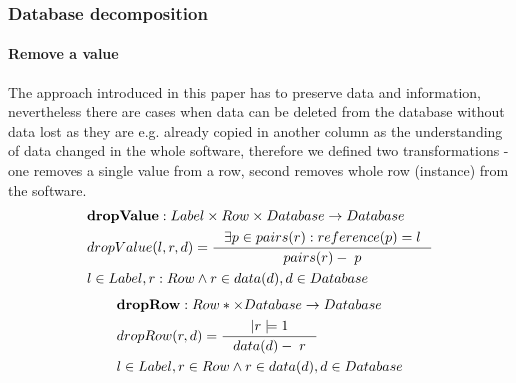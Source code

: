\documentclass[11pt]{article}
\begin{document}
\subsubsection{Database decomposition}
\paragraph{Remove a value}  The approach introduced in this paper has to  preserve data and information, nevertheless there are cases when data can be deleted from the database without data lost as they are e.g. already copied in another column as the understanding of data changed in the whole software, therefore we defined two transformations - one removes a single value from a row, second removes whole row (instance) from the software.
\begin{align*}
&	\mathbf{dropValue} : Label \times Row \times Database \rightarrow Database \\
&	dropValue(l, r, d) = \inference{\exists p \in pairs(r) : reference(p) = l}{pairs(r) - \; p}\\ 
& l \in Label, r : Row \wedge r \in data(d), d \in Database
\end{align*}
\begin{align*}
&	\mathbf{dropRow} :  Row*  \times Database \rightarrow Database\\
&	dropRow(r, d) = \inference{|r|=1}{data(d) - \; r}	\\ 
& l \in Label, r \in Row \wedge r \in data(d), d \in Database
\end{align*}
\end{document}
